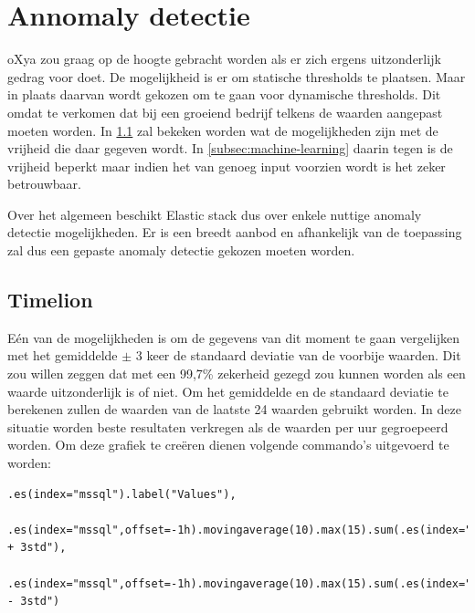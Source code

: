 \section{Annomaly detectie}
\label{sec:annomaly detectie}

oXya zou graag op de hoogte gebracht worden als er zich ergens uitzonderlijk gedrag voor doet. De mogelijkheid is er om statische thresholds te plaatsen.
Maar in plaats daarvan wordt gekozen om te gaan voor dynamische thresholds. Dit omdat te verkomen dat bij een groeiend bedrijf telkens de waarden aangepast moeten worden.
In \ref{subsec:timelion} zal bekeken worden wat de mogelijkheden zijn met de vrijheid die daar gegeven wordt.
In \ref{subsec:machine-learning} daarin tegen is de vrijheid beperkt maar indien het van genoeg input voorzien wordt is het zeker betrouwbaar.

Over het algemeen beschikt Elastic stack dus over enkele nuttige anomaly detectie mogelijkheden. 
Er is een breedt aanbod en afhankelijk van de toepassing zal dus een gepaste anomaly detectie gekozen moeten worden.

\subsection{Timelion}
\label{subsec:timelion}

Eén van de mogelijkheden is om de gegevens van dit moment te gaan vergelijken met het gemiddelde $\pm$ 3 keer de standaard deviatie van de voorbije waarden.
Dit zou willen zeggen dat met een 99,7\% zekerheid gezegd zou kunnen worden als een waarde uitzonderlijk is of niet. Om het gemiddelde en de standaard deviatie te berekenen zullen de waarden van de laatste 24 waarden gebruikt worden. 
In deze situatie worden beste resultaten verkregen als de waarden per uur gegroepeerd worden. Om deze grafiek te creëren dienen volgende commando's uitgevoerd te worden:
\lstset{escapechar=@,style=customc}        
\begin{lstlisting}[frame=single]  
	.es(index="mssql").label("Values"),
	.es(index="mssql",offset=-1h).movingaverage(10).max(15).sum(.es(index="mssql",offset=-1h).movingstd(10).multiply(3)).label("gem + 3std"),
	.es(index="mssql",offset=-1h).movingaverage(10).max(15).sum(.es(index="mssql",offset=-1h).movingstd(10).multiply(-3)).label("gem - 3std")
\end{lstlisting}

